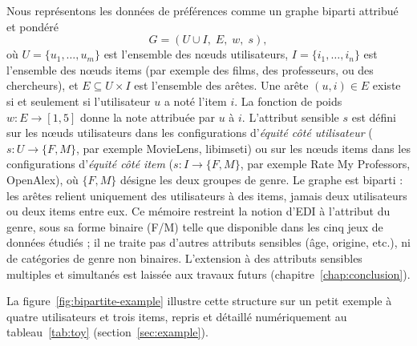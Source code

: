 \documentclass[12pt]{report}
\begin{document}
Nous représentons les données de préférences comme un graphe biparti
attribué et pondéré
\[
  G = (U \cup I,\; E,\; w,\; s),
\]
où $U = \{u_1, \ldots, u_m\}$ est l'ensemble des nœuds utilisateurs, $I =
\{i_1, \ldots, i_n\}$ est l'ensemble des nœuds items (par exemple des
films, des professeurs, ou des chercheurs), et $E \subseteq U \times I$
est l'ensemble des arêtes. Une arête $(u, i) \in E$ existe si et seulement
si l'utilisateur $u$ a noté l'item $i$. La fonction de poids $w : E
\rightarrow [1, 5]$ donne la note attribuée par $u$ à $i$. L'attribut
sensible $s$ est défini sur les nœuds utilisateurs dans les configurations
d'\emph{équité côté utilisateur} ($s : U \rightarrow \{F, M\}$, par
exemple MovieLens, libimseti) ou sur les nœuds items dans les
configurations d'\emph{équité côté item} ($s : I \rightarrow \{F, M\}$,
par exemple Rate My Professors, OpenAlex), où $\{F, M\}$ désigne les deux
groupes de genre. Le graphe est biparti : les arêtes relient uniquement
des utilisateurs à des items, jamais deux utilisateurs ou deux items entre
eux. Ce mémoire restreint la notion d'EDI à l'attribut du genre, sous sa
forme binaire (F/M) telle que disponible dans les cinq jeux de données
étudiés ; il ne traite pas d'autres attributs sensibles (âge, origine,
etc.), ni de catégories de genre non binaires. L'extension à des
attributs sensibles multiples et simultanés est laissée aux travaux
futurs (chapitre~\ref{chap:conclusion}).

La figure~\ref{fig:bipartite-example} illustre cette structure sur un
petit exemple à quatre utilisateurs et trois items, repris et détaillé
numériquement au tableau~\ref{tab:toy} (section~\ref{sec:example}).
\end{document}
